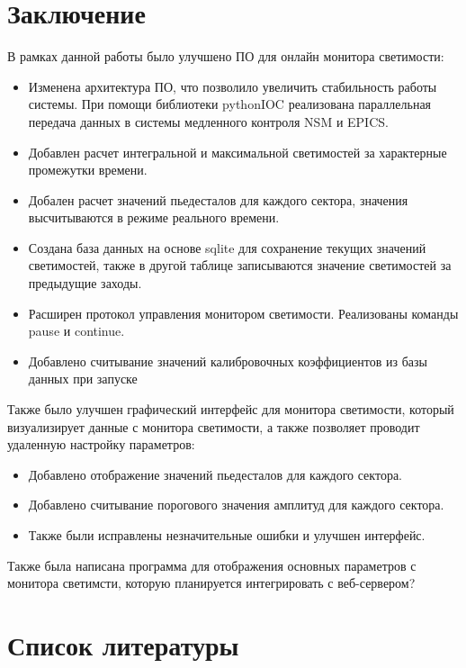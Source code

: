 \documentclass[a4paper, 12pt]{article}
\begin{document}
\section{Заключение}
    В рамках данной работы было улучшено ПО для онлайн монитора светимости:
    \begin{itemize}
        \item Изменена архитектура ПО, что позволило увеличить стабильность работы системы. При помощи библиотеки pythonIOC реализована параллельная передача данных в системы медленного контроля NSM и EPICS.
        \item Добавлен расчет интегральной и максимальной светимостей за характерные промежутки времени.
        \item Добален расчет значений пьедесталов для каждого сектора, значения высчитываются в режиме реального времени.
        \item Создана база данных на основе sqlite для сохранение текущих значений светимостей, также в другой таблице записываются значение светимостей за предыдущие заходы.
        \item Расширен протокол управления монитором светимости. Реализованы команды pause и continue.
        \item Добавлено считывание значений калибровочных коэффициентов из базы данных при запуске
    \end{itemize}
    
    Также было улучшен графический интерфейс для монитора светимости, который визуализирует данные с монитора светимости, а также позволяет проводит удаленную настройку параметров:
    \begin{itemize} 
        \item Добавлено отображение значений пьедесталов для каждого сектора.
        \item Добавлено считывание порогового значения амплитуд для каждого сектора.
        \item Также были исправлены незначительные ошибки и улучшен интерфейс.
    \end{itemize}
    
    Также была написана программа для отображения основных параметров с монитора светимсти, которую планируется интегрировать с веб-сервером?

\section{Список литературы}
\end{document}
